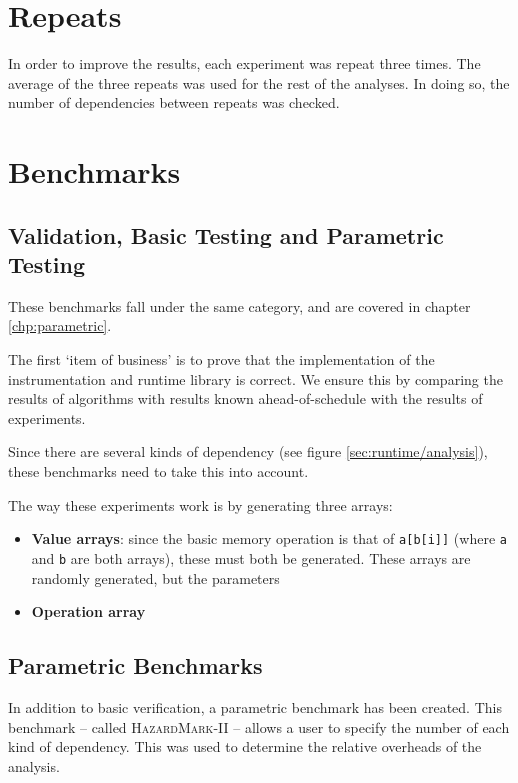 \section{Repeats} \label{sec:methodology/repeats}
In order to improve the results, each experiment was repeat three times. The average of the three repeats was used for the rest of the analyses. In doing so, the number of dependencies between repeats was checked.

\section{Benchmarks} \label{sec:methodology/benchmarks}
	\subsection{Validation, Basic Testing and Parametric Testing} \label{sec:methodology/benchmarks/simple}
	These benchmarks fall under the same category, and are covered in chapter \ref{chp:parametric}.
	
	The first `item of business' is to prove that the implementation of the instrumentation and runtime library is correct. We ensure this by comparing the results of algorithms with results known ahead-of-schedule with the results of experiments.
	
	Since there are several kinds of dependency (see figure \ref{sec:runtime/analysis}), these benchmarks need to take this into account.
	
	The way these experiments work is by generating three arrays:
	
	\begin{itemize}
		\item \textbf{Value arrays}: since the basic memory operation is that of \texttt{a[b[i]]} (where \texttt{a} and \texttt{b} are both arrays), these must both be generated. These arrays are randomly generated, but the parameters
		\item \textbf{Operation array} 
	\end{itemize}
	
	\subsection{Parametric Benchmarks} \label{sec:methodology/benchmarks/parametric}
	In addition to basic verification, a parametric benchmark has been created. This benchmark -- called \textsc{HazardMark-II} -- allows a user to specify the number of each kind of dependency. This was used to determine the relative overheads of the analysis.
	
